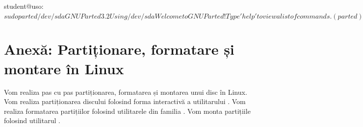 \begin{screen}[caption={Gestiunea discurilor folosind parted},label={lst:storage:parted}]
student@uso:~$ sudo parted /dev/sda
GNU Parted 3.2
Using /dev/sda
Welcome to GNU Parted! Type 'help' to view a list of commands.
(parted) help
  align-check TYPE N                        check partition N for TYPE(min|opt) alignment
  help [COMMAND]                           print general help, or help on COMMAND
  mklabel,mktable LABEL-TYPE               create a new disklabel (partition table)
  mkpart PART-TYPE [FS-TYPE] START END     make a partition
  name NUMBER NAME                         name partition NUMBER as NAME
  print [devices|free|list,all|NUMBER]     display the partition table, available devices, free space, all found partitions, or a particular partition
  quit                                     exit program
  rescue START END                         rescue a lost partition near START and END
  resizepart NUMBER END                    resize partition NUMBER
  rm NUMBER                                delete partition NUMBER
  select DEVICE                            choose the device to edit
  disk_set FLAG STATE                      change the FLAG on selected device
  disk_toggle [FLAG]                       toggle the state of FLAG on selected device
  set NUMBER FLAG STATE                    change the FLAG on partition NUMBER
  toggle [NUMBER [FLAG]]                   toggle the state of FLAG on partition NUMBER
  unit UNIT                                set the default unit to UNIT
  version                                  display the version number and copyright information of GNU Parted
(parted) p
Model: ATA VBOX HARDDISK (scsi)
Disk /dev/sda: 17.2GB
Sector size (logical/physical): 512B/512B
Partition Table: msdos
Disk Flags:

Number  Start   End     Size    Type     File system  Flags
 1      1049kB  17.2GB  17.2GB  primary  ext4         boot

(parted) q

student@uso:~$
\end{screen}

\section{Anexă: Partiționare, formatare și montare în Linux}
\label{sec:storage:partition-cmd}

Vom realiza pas cu pas partiționarea, formatarea și montarea unui disc în Linux.
Vom realiza partiționarea discului folosind forma interactivă a utilitarului .
Vom realiza formatarea partițiilor folosind utilitarele din familia .
Vom monta partițiile folosind utilitarul .


